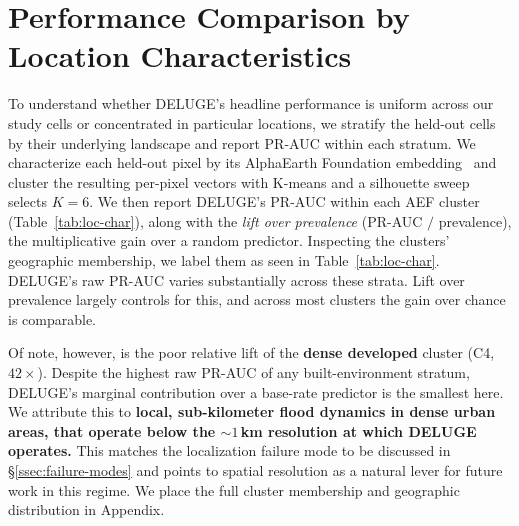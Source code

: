 \section{Performance Comparison by Location Characteristics}\label{ssec:loc_char}
To understand whether DELUGE's headline performance is uniform across our study cells or concentrated in particular locations, we stratify the held-out cells by their underlying landscape and report PR-AUC within each stratum.
%
We characterize each held-out pixel by its AlphaEarth Foundation embedding~\cite{brown_alphaearth_2025} and cluster the resulting per-pixel vectors with K-means and a silhouette sweep selects $K=6$.
%
We then report DELUGE's PR-AUC within each AEF cluster (Table~\ref{tab:loc-char}), along with the \emph{lift over prevalence} (PR-AUC $/$ prevalence), the multiplicative gain over a random predictor.
%
Inspecting the clusters' geographic membership, we label them as seen in Table~\ref{tab:loc-char}.
%
DELUGE's raw PR-AUC varies substantially across these strata.
%
Lift over prevalence largely controls for this, and across most clusters the gain over chance is comparable.

Of note, however, is the poor relative lift of the \textbf{dense developed} cluster (C4, $42\times$).
%
Despite the highest raw PR-AUC of any built-environment stratum, DELUGE's marginal contribution over a base-rate predictor is the smallest here.
%
We attribute this to \textbf{local, sub-kilometer flood dynamics in dense urban areas, that operate below the ${\sim}1$\,km resolution at which DELUGE operates.}
%
This matches the localization failure mode to be discussed in \S\ref{ssec:failure-modes} and points to spatial resolution as a natural lever for future work in this regime.
%
We place the full cluster membership and geographic distribution in Appendix.

